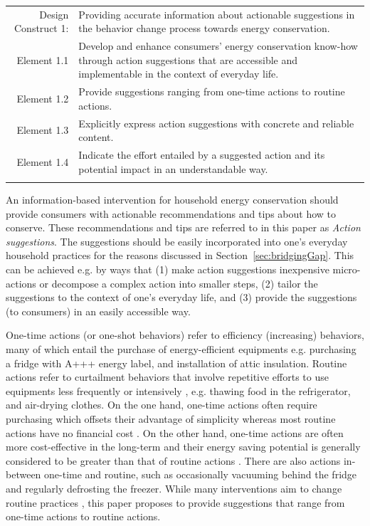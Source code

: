 \documentclass[a4paper]{article}
\begin{document}
\begin{table}[h!]
\def\arraystretch{1.5}
\begin{tabularx}{\textwidth}{!{\color{gray!40}\vrule} r X !{\color{gray!40}\vrule}}
\hline
{} Design Construct 1:  &  Providing accurate information about actionable suggestions in the behavior change process towards energy conservation. \\  \hline
Element 1.1 & Develop and enhance consumers' energy conservation know-how through action suggestions that are accessible and implementable in the context of everyday life.\\
Element 1.2 & Provide suggestions ranging from one-time actions to routine actions.\\
Element 1.3 & Explicitly express action suggestions with concrete and reliable content.\\
Element 1.4 & Indicate the effort entailed by a suggested action and its potential impact in an understandable way.\\ \hline
\end{tabularx}
\end{table}


An information-based intervention for household energy conservation should provide consumers with actionable recommendations and tips about how to conserve. These recommendations and tips are referred to in this paper as \textit{Action suggestions}. The suggestions should be easily incorporated into one's everyday household practices for the reasons discussed in Section~\ref{sec:bridgingGap}. This can be achieved e.g. by ways that (1) make action suggestions inexpensive micro-actions or decompose a complex action into smaller steps, (2) tailor the suggestions to the context of one's everyday life, and (3) provide the suggestions (to consumers) in an easily accessible way. 

One-time actions (or one-shot behaviors) refer to efficiency (increasing) behaviors, many of which entail the purchase of energy-efficient equipments \citep{Abrahamse2005,Gardner2008} 
e.g. purchasing a fridge with A+++ energy label, and installation of attic insulation. Routine actions refer to curtailment behaviors that involve repetitive efforts to use equipments less frequently or intensively \citep{Abrahamse2005,Gardner2008}, e.g. thawing food in the refrigerator, and air-drying clothes. On the one hand, one-time actions often require purchasing which offsets their advantage of simplicity whereas most routine actions have no financial cost \citep{Abrahamse2005,Gardner2008}. On the other hand, one-time actions are often more cost-effective in the long-term \citep{Froehlich2009} and their energy saving potential is generally considered to be greater than that of routine actions \citep{Abrahamse2005,Gardner2008}. There are also actions in-between one-time and routine, such as occasionally vacuuming behind the fridge and regularly defrosting the freezer. While many interventions aim to change routine practices \citep{Froehlich2009}, this paper proposes to provide suggestions that range from one-time actions to routine actions. 
\end{document}

